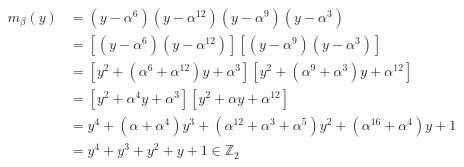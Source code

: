 \begin{exbox}
\begin{example}
\begin{align*}
            m_\beta(y)
             & =(y-\alpha^{6})(y-\alpha^{12})(y-\alpha^{9})(y-\alpha^3)                                 \\
             & =[(y-\alpha^{6})(y-\alpha^{12})][(y-\alpha^{9})(y-\alpha^3)]                             \\
             & =[y^2+(\alpha^6+\alpha^{12})y+\alpha^3][y^2+(\alpha^9+\alpha^3)y+\alpha^{12}]            \\
             & =[y^2+\alpha^4 y+\alpha^3][y^2+\alpha y+\alpha^{12}]                                     \\
             & =y^4+(\alpha+\alpha^4)y^3+(\alpha^{12}+\alpha^3+\alpha^5)y^2+(\alpha^{16}+\alpha^{4})y+1 \\
             & =y^4+y^3+y^2+y+1\in \mathbb{Z}_2
        \end{align*}
    \end{example}
\end{exbox}
